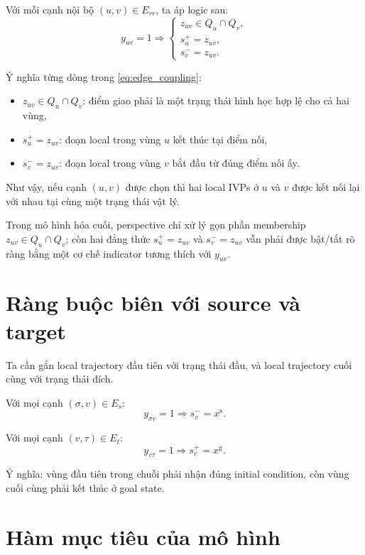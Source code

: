 \documentclass[12pt]{article}
\begin{document}
Với mỗi cạnh nội bộ $(u,v)\in E_{rr}$, ta áp logic sau:
\begin{equation}
y_{uv}=1 \Longrightarrow
\begin{cases}
z_{uv}\in Q_u\cap Q_v,\\
s_u^+=z_{uv},\\
s_v^-=z_{uv}.
\end{cases}
\label{eq:edge_coupling}
\end{equation}

Ý nghĩa từng dòng trong \eqref{eq:edge_coupling}:
\begin{itemize}
    \item $z_{uv}\in Q_u\cap Q_v$: điểm giao phải là một trạng thái hình học hợp lệ cho cả hai vùng,
    \item $s_u^+=z_{uv}$: đoạn local trong vùng $u$ kết thúc tại điểm nối,
    \item $s_v^-=z_{uv}$: đoạn local trong vùng $v$ bắt đầu từ đúng điểm nối ấy.
\end{itemize}

Như vậy, nếu cạnh $(u,v)$ được chọn thì hai local IVPs ở $u$ và $v$ được kết nối lại với nhau tại cùng một trạng thái vật lý.

Trong mô hình hóa cuối, perspective chỉ xử lý gọn phần membership $z_{uv}\in Q_u\cap Q_v$; còn hai đẳng thức $s_u^+=z_{uv}$ và $s_v^-=z_{uv}$ vẫn phải được bật/tắt rõ ràng bằng một cơ chế indicator tương thích với $y_{uv}$.

\section{Ràng buộc biên với source và target}

Ta cần gắn local trajectory đầu tiên với trạng thái đầu, và local trajectory cuối cùng với trạng thái đích.

Với mọi cạnh $(\sigma,v)\in E_s$:
\begin{equation}
y_{\sigma v}=1 \Longrightarrow s_v^-=x^{\mathrm s}.
\label{eq:source_bc}
\end{equation}

Với mọi cạnh $(v,\tau)\in E_t$:
\begin{equation}
y_{v\tau}=1 \Longrightarrow s_v^+=x^{\mathrm g}.
\label{eq:target_bc}
\end{equation}

Ý nghĩa: vùng đầu tiên trong chuỗi phải nhận đúng initial condition, còn vùng cuối cùng phải kết thúc ở goal state.

\section{Hàm mục tiêu của mô hình}
\end{document}
